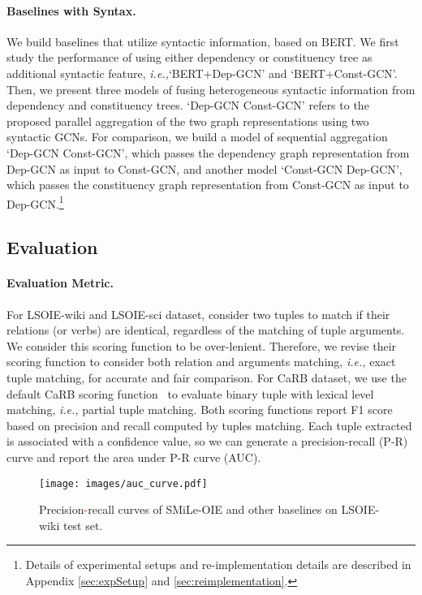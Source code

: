\documentclass[11pt]{article}
\newcommand{\ie}{\emph{i.e.,}\xspace}
\newcommand{\mname}{SMiLe-OIE\xspace}
\newcommand{\jj}[1]{{\textcolor{red}{#1}}}
\begin{document}
\paragraph{Baselines with Syntax.}
We build baselines that utilize syntactic information, based on BERT. We first study the performance of using either dependency or constituency tree as additional syntactic feature, \ie `BERT+Dep-GCN' and `BERT+Const-GCN'. Then, we present three models of fusing heterogeneous syntactic information from dependency and constituency trees. `Dep-GCN  Const-GCN' refers to the proposed parallel aggregation of the two graph representations using two syntactic GCNs. For comparison, we build a model of sequential aggregation `Dep-GCN  Const-GCN', which passes the dependency graph representation from Dep-GCN as input to Const-GCN, and another model `Const-GCN  Dep-GCN', which passes the constituency graph representation from Const-GCN as input to Dep-GCN.\footnote{Details of experimental setups and re-implementation details are described in Appendix \ref{sec:expSetup} and \ref{sec:reimplementation}.}


\subsection{Evaluation}

\paragraph{Evaluation Metric.}

For LSOIE-wiki and LSOIE-sci dataset, \citet{solawetz-larson-2021-lsoie} consider two tuples to match if their relations (or verbs) are identical, regardless of the matching of tuple arguments. We consider this scoring function to be over-lenient. Therefore, we revise their scoring function to consider both relation and arguments matching, \ie exact tuple matching, for accurate and fair comparison.
For CaRB dataset, we use the default CaRB scoring function~\cite{bhardwaj2019carb} to evaluate binary tuple with lexical level matching, \ie partial tuple matching.
Both scoring functions report F1 score based on precision and recall computed by tuples matching. Each tuple extracted is associated with a confidence value, so we can generate a precision-recall (P-R) curve and report the area under P-R curve (AUC).

\begin{figure}[t]
  \centering
  \texttt{[image: images/auc\_curve.pdf]}
  \vspace{-2.0em}
  \caption{Precision\jj{-}recall curves of \mname and other baselines on LSOIE-wiki test set.}
  \label{fig:auc}
\end{figure}
\end{document}
